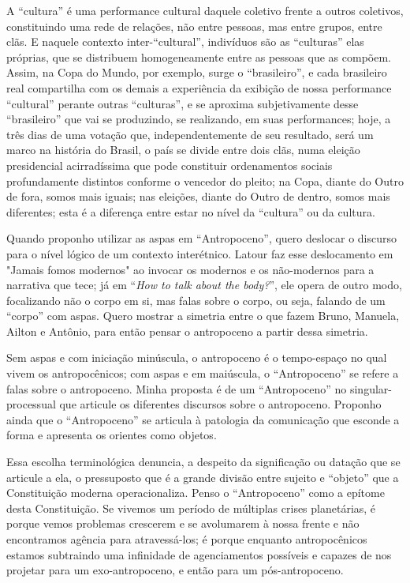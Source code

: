 A \enquote{cultura} é uma performance cultural daquele coletivo frente a outros coletivos, constituindo uma rede de relações, não entre pessoas, mas entre grupos, entre clãs. E naquele contexto inter-\enquote{cultural}, indivíduos são as \enquote{culturas} elas próprias, que se distribuem homogeneamente entre as pessoas que as compõem. Assim, na Copa do Mundo, por exemplo, surge o \enquote{brasileiro}, e cada brasileiro real compartilha com os demais a experiência da exibição de nossa performance \enquote{cultural} perante outras \enquote{culturas}, e se aproxima subjetivamente desse \enquote{brasileiro} que vai se produzindo, se realizando, em suas performances; hoje, a três dias de uma votação que, independentemente de seu resultado, será um marco na história do Brasil, o país se divide entre dois clãs, numa eleição presidencial acirradíssima que pode constituir ordenamentos sociais profundamente distintos conforme o vencedor do pleito; na Copa, diante do Outro de fora, somos mais iguais; nas eleições, diante do Outro de dentro, somos mais diferentes; esta é a diferença entre estar no nível da \enquote{cultura} ou da cultura.

Quando proponho utilizar as aspas em \enquote{Antropoceno}, quero deslocar o discurso para o nível lógico de um contexto interétnico. Latour faz esse deslocamento em "Jamais fomos modernos" ao invocar os modernos e os não-modernos para a narrativa que tece; já em \enquote{\textit{How to talk about the body?}}, ele opera de outro modo, focalizando não o corpo em si, mas \guillemetleft falas sobre o corpo\guillemetright, ou seja, falando de um \enquote{corpo} com aspas. Quero mostrar a simetria entre o que fazem Bruno, Manuela, Ailton e Antônio, para então pensar o antropoceno a partir dessa simetria.

Sem aspas e com iniciação minúscula, o antropoceno é o tempo-espaço no qual vivem os antropocênicos; com aspas e em maiúscula, o \enquote{Antropoceno} se refere a \guillemetleft falas sobre o antropoceno\guillemetright. Minha proposta é de um \enquote{Antropoceno} no singular-processual que articule os diferentes discursos sobre o antropoceno. Proponho ainda que o \enquote{Antropoceno} se articula à patologia da comunicação que esconde a forma e apresenta os orientes como objetos.

Essa escolha terminológica denuncia, a despeito da significação ou datação que se articule a ela, o pressuposto que é a grande divisão entre sujeito e \enquote{objeto} que a Constituição moderna operacionaliza. Penso o \enquote{Antropoceno} como a epítome desta Constituição. Se vivemos um período de múltiplas crises planetárias, é porque vemos problemas crescerem e se avolumarem à nossa frente e não encontramos agência para atravessá-los; é porque enquanto antropocênicos estamos subtraindo uma infinidade de agenciamentos possíveis e capazes de nos projetar para um exo-antropoceno, e então para um pós-antropoceno.

